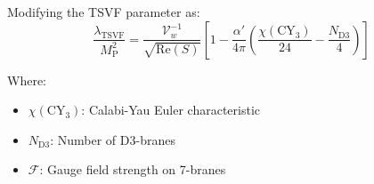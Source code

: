 \documentclass[12pt, onecolumn]{article}
\theoremstyle{definition}
\newcommand{\tsvf}{\lambda_{\mathrm{TSVF}}}
\newcommand{\Mp}{M_{\mathrm{P}}}
\numberwithin{equation}{section}
\begin{document}
\begin{appendices}
Modifying the TSVF parameter as:
\begin{equation}
\frac{\tsvf}{\Mp^2} = \frac{\mathcal{V}_w^{-1}}{\sqrt{\text{Re}(S)}} \left[1 - \frac{\alpha'}{4\pi}\left(\frac{\chi(\text{CY}_3)}{24} - \frac{N_{\text{D3}}}{4}\right)\right]
\end{equation}

Where:
\begin{itemize}
\item \(\chi(\text{CY}_3)\): Calabi-Yau Euler characteristic
\item \(N_{\text{D3}}\): Number of D3-branes
\item \(\mathcal{F}\): Gauge field strength on 7-branes
\end{itemize}
\end{appendices}
\end{document}
